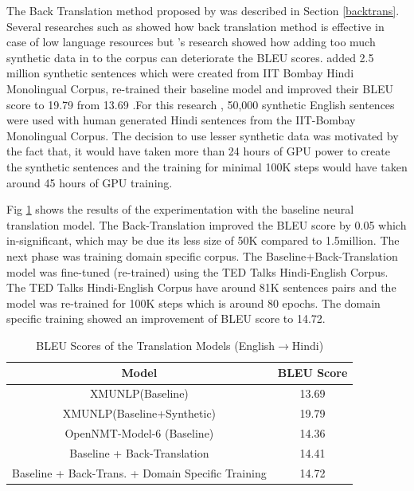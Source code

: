 The Back Translation method proposed by \cite{DBLP:journals/corr/SennrichHB15a} was described in Section \ref{backtrans}. Several researches such as \cite{W18-2703} showed how back translation method is effective in case of low language resources but \cite{DBLP:journals/corr/abs-1804-06189}'s research showed how adding too much synthetic data in to the corpus  can deteriorate the BLEU scores.\cite{W17-5707} added 2.5 million synthetic sentences which were created from IIT Bombay Hindi Monolingual Corpus, re-trained their baseline model and improved their BLEU score to 19.79 from 13.69 .For this research , 50,000 synthetic English sentences were used with human generated Hindi sentences from the IIT-Bombay Monolingual Corpus. The decision to use lesser synthetic data was motivated by the fact that, it would have taken more than 24 hours of GPU power to create the synthetic sentences and the training for minimal 100K steps would have taken around 45 hours of GPU training.

Fig \ref{bleutable2} shows the results of the experimentation with the baseline neural translation model. The Back-Translation improved the BLEU score by 0.05 which in-significant, which may be due its less size of 50K compared to 1.5million. The next phase was training domain specific corpus. The Baseline+Back-Translation model was fine-tuned (re-trained) using the TED Talks Hindi-English Corpus. The TED Talks Hindi-English Corpus have around 81K sentences pairs and the model was re-trained for 100K steps which is around 80 epochs. The domain specific training showed an improvement of BLEU score to 14.72.

\begin{table}[h!]
\centering
 \begin{tabular}{ |c|c| } 
  \hline Model & BLEU Score  \\ 
  \hline  XMUNLP(Baseline) &   13.69\\
  XMUNLP(Baseline+Synthetic) &   19.79\\
  \hline  OpenNMT-Model-6 (Baseline) &   14.36\\
  Baseline + Back-Translation & 14.41\\
  Baseline + Back-Trans. + Domain Specific Training & 14.72\\
  \hline
 \end{tabular}
\caption{BLEU Scores of the Translation Models (English$\rightarrow$Hindi)}
\label{bleutable2}
\end{table}

